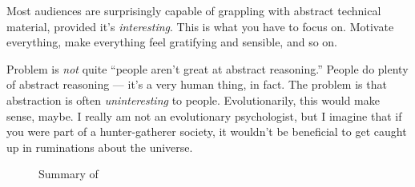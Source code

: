 \documentclass{fkpset}
\begin{document}
\begin{solution}[Response.]
  Most audiences are surprisingly capable of grappling with abstract
  technical material, provided it's \emph{interesting}. This is what
  you have to focus on. Motivate everything, make everything feel
  gratifying and sensible, and so on.

  Problem is \emph{not} quite ``people aren't great at abstract
  reasoning.'' People do plenty of abstract reasoning --- it's a very
  human thing, in fact. The problem is that abstraction is often
  \emph{uninteresting} to people. Evolutionarily, this would make
  sense, maybe. I really am not an evolutionary psychologist, but I
  imagine that if you were part of a hunter-gatherer society, it
  wouldn't be beneficial to get caught up in ruminations about the
  universe.
  \begin{figure}[h]
    \centering
    \caption{Summary of }
  \end{figure}


\end{solution}
\end{document}
